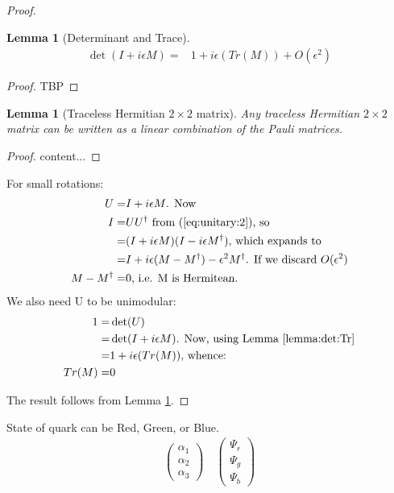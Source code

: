 \documentclass[]{article}
\newtheorem{lemma}[thm]{Lemma}
\begin{document}
\begin{proof}
	\begin{lemma}[Determinant and Trace]\label{lemma:det:Tr}
		\begin{align*}
		\det( I + i \epsilon M) =& 1 + i\epsilon(Tr(M)) + O(\epsilon^2)
		\end{align*}
	\end{lemma}
	\begin{proof}
		TBP
	\end{proof}
	\begin{lemma}[Traceless Hermitian $2\times2$ matrix]\label{lemma:traceless:22}
		Any traceless Hermitian $2\times2$ matrix can be written as a linear combination of the Pauli  matrices.
	\end{lemma}
	\begin{proof}
		content...
	\end{proof}

	For small rotations:
	\begin{align*}
	U =& I + i \epsilon M \text{. Now}\\
	I =&U U^\dagger \text{ from (\ref{eq:unitary:2}), so}\\
	=& (I + i \epsilon M)(I - i\epsilon M^\dagger) \text{, which expands to}\\
	=& I + i \epsilon(M - M^\dagger) - \epsilon^2 M^\dagger \text{. If we discard $O(\epsilon^2)$}\\
	M - M^\dagger =& 0 \text{, i.e. M is Hermitean.}
	\end{align*}
	We also need U to be unimodular:
	\begin{align*}
	1=&\det(U)\\
	=& \det( I + i \epsilon M) \text{. Now, using Lemma \ref{lemma:det:Tr}}\\
	=& 1 + i\epsilon(Tr(M)) \text{, whence:}\\
	Tr(M) =&0
	\end{align*}
	
	The result follows from Lemma \ref{lemma:traceless:22}.
	
\end{proof}

State of quark can be Red, Green, or Blue. 
\begin{align*}
	\begin{pmatrix}
		\alpha_1\\
		\alpha_2\\
		\alpha_3
	\end{pmatrix} \quad	\begin{pmatrix}
	\Psi_r\\
	\Psi_g\\
	\Psi_b
	\end{pmatrix}
\end{align*}
\end{document}

